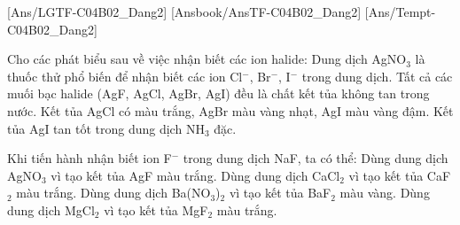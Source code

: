 \documentclass[Main.tex]{subfiles}
\begin{document}
    [Ans/LGTF-C04B02_Dang2]
    [Ansbook/AnsTF-C04B02_Dang2]
    [Ans/Tempt-C04B02_Dang2]
    \begin{ex}
        Cho các phát biểu sau về việc nhận biết các ion halide:
        \choiceTF
        {\True Dung dịch AgNO$_3$ là thuốc thử phổ biến để nhận biết các ion Cl$^-$, Br$^-$, I$^-$ trong dung dịch.}
        {Tất cả các muối bạc halide (AgF, AgCl, AgBr, AgI) đều là chất kết tủa không tan trong nước.}
        {\True Kết tủa AgCl có màu trắng, AgBr màu vàng nhạt, AgI màu vàng đậm.}
        {Kết tủa AgI tan tốt trong dung dịch NH$_3$ đặc.}
    \end{ex}
    \begin{ex}
        Khi tiến hành nhận biết ion F$^-$ trong dung dịch NaF, ta có thể:
        \choiceTF
        {Dùng dung dịch AgNO$_3$ vì tạo kết tủa AgF màu trắng.}
        {\True Dùng dung dịch CaCl$_2$ vì tạo kết tủa CaF$_2$ màu trắng.}
        {Dùng dung dịch Ba(NO$_3$)$_2$ vì tạo kết tủa BaF$_2$ màu vàng.}
        {\True Dùng dung dịch MgCl$_2$ vì tạo kết tủa MgF$_2$ màu trắng.}
    \end{ex}
\end{document}
